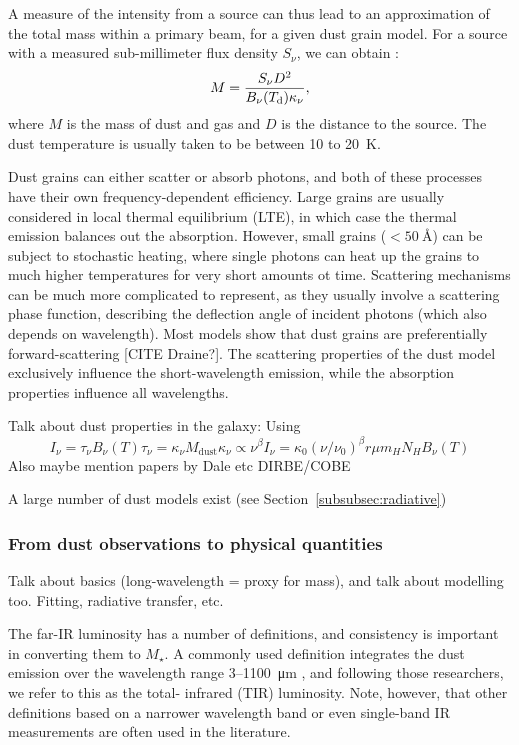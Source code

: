 A measure of the  intensity from a source can thus lead to an approximation of the total mass within a primary beam, for a given dust grain model. For a source with a measured sub-millimeter flux density $S_\nu$, we can obtain \citep{Shirley:2000gh}:
\begin{equation}
M = \frac{S_\nu D^2}{B_\nu(T_{\textrm{d}})\kappa_\nu},
\end{equation}
where $M$ is the mass of dust and gas and $D$ is the distance to the source. The dust temperature is usually taken to be between 10 to \SI{20}{\kelvin}. 

Dust grains can either scatter or absorb photons, and both of these processes have their own frequency-dependent efficiency. Large grains are usually considered in local thermal equilibrium (LTE), in which case the thermal emission balances out the absorption. However, small grains ($<\SI{50}{\angstrom}$) can be subject to stochastic heating, where single photons can heat up the grains to much higher temperatures for very short amounts ot time. Scattering mechanisms can be much more complicated to represent, as they usually involve a scattering phase function, describing the deflection angle of incident photons (which also depends on wavelength). Most models show that dust grains are preferentially forward-scattering [CITE Draine?]. The scattering properties of the dust model exclusively influence the short-wavelength emission, while the absorption properties influence all wavelengths. 

Talk about dust properties in the galaxy: \citep{Collaboration:2014dz} Using
\begin{equation}
I_\nu = \tau_\nu B_\nu(T)
\tau_\nu = \kappa_\nu M_\textrm{dust}
\kappa_\nu\propto \nu^\beta
I_\nu = \kappa_0(\nu/\nu_0)^\beta r\mu m_H N_H B_\nu(T)
\end{equation}
Also maybe mention papers by Dale etc DIRBE/COBE

A large number of dust models exist (see Section~\ref{subsubsec:radiative})


\subsubsection{From dust observations to physical quantities}
Talk about basics (long-wavelength = proxy for mass), and talk about modelling too. Fitting, radiative transfer, etc.

The far-IR luminosity has a number of definitions, and consistency is important in converting them to $M_\star$. A commonly used definition integrates the dust emission over the wavelength range 3–\SI{1100}{\micro\meter} \citep{Dale:2002bo}, and following those researchers, we refer to this as the total- infrared (TIR) luminosity. Note, however, that other definitions based on a narrower wavelength band or even single-band IR measurements are often used in the literature.

